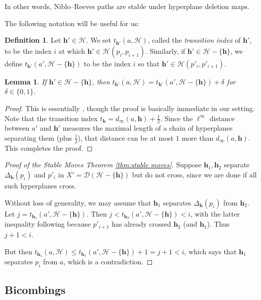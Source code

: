 \documentclass{amsart}
\newtheorem{lemma}[theorem]{Lemma}
\theoremstyle{definition}
\newtheorem{definition}[theorem]{Definition}
\theoremstyle{remark}
\theoremstyle{definition}
\newcommand{\hh}{{\sf h}}
\newcommand{\calD}{\mathcal{D}}
\newcommand{\calH}{\mathcal{H}}
\renewcommand{\hh}{\mathbf{h}}
\begin{document}
In other words, Niblo--Reeves paths are stable under hyperplane deletion maps.

The following notation will be useful for us:

\begin{definition}
Let $\hh' \in \calH$.  We set $t_{\hh'}(a, \calH)$, called the \emph{transition index} of $\hh'$, to be the index $i$ at which $\hh' \in \calH(p_i, p_{i+1})$.  Similarly, if $\hh' \in \calH - \{\hh\}$, we define $t_{\hh'}(a', \calH - \{\hh\})$ to be the index $i$ so that $\hh' \in \calH(p'_i, p'_{i+1})$.
\end{definition} 

\begin{lemma}\label{lem:move control}
If $\hh' \in \calH - \{\hh\}$, then $t_{\hh'}(a,\calH) = t_{\hh'}(a', \calH - \{\hh\}) + \delta$ for $\delta \in \{0,1\}$.
\end{lemma}

\begin{proof}
This is essentially \cite[Lemma 5.12]{DMS_bary}, though the proof is basically immediate in our setting.  Note that the transition index $t_{\hh} = d_{\infty}(a, \hh) + \frac{1}{2}$.  Since the $\ell^{\infty}$ distance between $a'$ and $\hh'$ measures the maximal length of a chain of hyperplanes separating them (plus $\frac{1}{2}$), that distance can be at most $1$ more than $d_{\infty}(a,\hh)$.  This completes the proof.
\end{proof}

\begin{proof}[Proof of the Stable Moves Theorem \ref{thm:stable moves}]
Suppose $\hh_1, \hh_2$ separate $\Delta_{\hh}(p_i)$ and $p'_i$ in $X' = \calD(\calH - \{\hh\})$ but do not cross, since we are done if all such hyperplanes cross.

Without loss of generality, we may assume that $\hh_1$ separates $\Delta_{\hh}(p_i)$ from $\hh_2$.  Let $j = t_{\hh_1}(a',\calH - \{\hh\})$.  Then $j < t_{\hh_2}(a',\calH - \{\hh\}) < i$, with the latter inequality following because $p'_{i+1}$ has already crossed $\hh_2$ (and $\hh_1$).  Thus $j + 1 < i$.

But then $t_{\hh_1}(a, \calH) \leq t_{\hh_1}(a', \calH - \{\hh\}) + 1 = j+1 < i$, which says that $\hh_1$ separates $p_i$ from $a$, which is a contradiction.
\end{proof}


\subsection{Bicombings}\label{subsec:semihyp}
\end{document}
